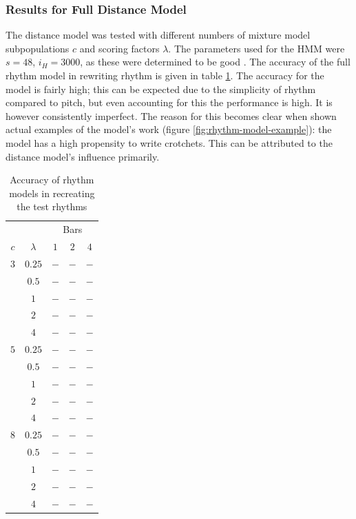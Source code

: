 \documentclass[ author={Stephen Livermore-Tozer},
				supervisor={Dr. Peter Flach},
				degree={MEng},
				title={Algorithmic Co-composition Using Machine Learning},
				subtitle={},
				type={research},
				year={2016} ]{dissertation}
\begin{document}
	\subsubsection{Results for Full Distance Model}
	
	The distance model was tested with different numbers of mixture model subpopulations $c$ and scoring factors $\lambda$. The parameters used for the HMM were $s = 48$, $i_H = 3000$, as these were determined to be good . The accuracy of the full rhythm model in rewriting rhythm is given in table \ref{tab:rhythm-model-results}. The accuracy for the model is fairly high; this can be expected due to the simplicity of rhythm compared to pitch, but even accounting for this the performance is high. It is however consistently imperfect. The reason for this becomes clear when shown actual examples of the model's work (figure \ref{fig:rhythm-model-example}): the model has a high propensity to write crotchets. This can be attributed to the distance model's influence primarily.
	
	\begin{table}[htp]
		\begin{center}
			\begin{tabular}{ccccc}
				\toprule
				& & \multicolumn{3}{c}{Bars}\\
				\cline{3-5}
				$c$ & $\lambda$ & $1$ & $2$ & $4$\\
				\hline
				$3$ & $0.25$ & $-$ & $-$ & $-$\\
				& $0.5$      & $-$ & $-$ & $-$\\
				& $1$        & $-$ & $-$ & $-$\\
				& $2$        & $-$ & $-$ & $-$\\
				& $4$        & $-$ & $-$ & $-$\\
				$5$ & $0.25$ & $-$ & $-$ & $-$\\
				& $0.5$      & $-$ & $-$ & $-$\\
				& $1$        & $-$ & $-$ & $-$\\
				& $2$        & $-$ & $-$ & $-$\\
				& $4$        & $-$ & $-$ & $-$\\
				$8$ & $0.25$ & $-$ & $-$ & $-$\\
				& $0.5$      & $-$ & $-$ & $-$\\
				& $1$        & $-$ & $-$ & $-$\\
				& $2$        & $-$ & $-$ & $-$\\
				& $4$        & $-$ & $-$ & $-$\\
				\bottomrule
			\end{tabular}
		\end{center}
		\caption{Accuracy of rhythm models in recreating the test rhythms}
		\label{tab:rhythm-model-results}
	\end{table}
	
\end{document}

